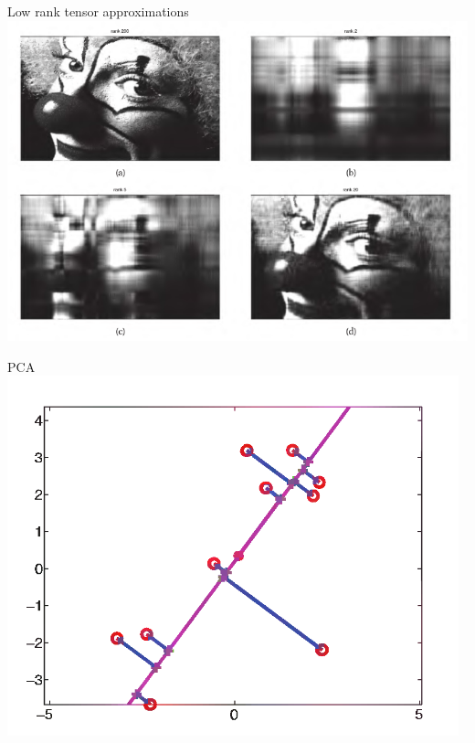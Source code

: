 \documentclass{beamer}
\begin{document}
{%
\begin{frame}{Low rank tensor approximations}
        \center{}
        \includegraphics[scale=0.35]{data/low_rank_clown}
\end{frame}
}

{%
\begin{frame}{PCA}
        \center{}
        \includegraphics[scale=0.4]{data/pca}
\end{frame}
}
\end{document}
